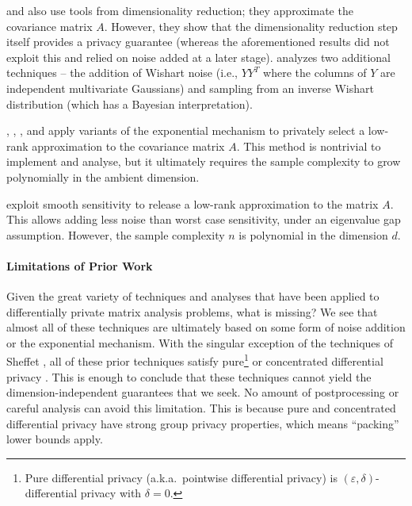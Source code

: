  and  also use tools from dimensionality reduction; they approximate the covariance matrix $A$. However, they show that the dimensionality reduction step itself provides a privacy guarantee (whereas the aforementioned results did not exploit this and relied on noise added at a later stage).  analyzes two additional techniques -- the addition of Wishart noise (i.e., $YY^T$ where the columns of $Y$ are independent multivariate Gaussians) and sampling from an inverse Wishart distribution (which has a Bayesian interpretation).

, , , and  apply variants of the exponential mechanism \cite{McSherryT07} to privately select a low-rank approximation to the covariance matrix $A$. This method is nontrivial to implement and analyse, but it ultimately requires the sample complexity to grow polynomially in the ambient dimension. %

 exploit smooth sensitivity \cite{NissimRS07} to release a low-rank approximation to the matrix $A$. This allows adding less noise than worst case sensitivity, under an eigenvalue gap assumption. However, the sample complexity $n$ is polynomial in the dimension $d$.

\paragraph{Limitations of Prior Work}
Given the great variety of techniques and analyses that have been applied to differentially private matrix analysis problems, what is missing?
We see that almost all of these techniques are ultimately based on some form of noise addition or the exponential mechanism. With the singular exception of the techniques of Sheffet \cite{Sheffet19}, all of these prior techniques satisfy pure\footnote{Pure differential privacy (a.k.a.~pointwise differential privacy) is $(\varepsilon,\delta)$-differential privacy with $\delta=0$.} or concentrated differential privacy \cite{BunS16}. This is enough to conclude that these techniques cannot yield the dimension-independent guarantees that we seek. No amount of postprocessing or careful analysis can avoid this limitation. This is because pure and concentrated differential privacy have strong group privacy properties, which means ``packing'' lower bounds \cite{HardtT10} apply.

